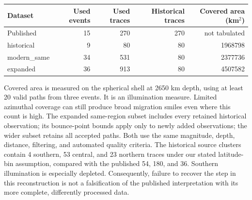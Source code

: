 \documentclass[10pt]{article}
\begin{document}
\begin{center}\begin{tabular}{lrrrr}\toprule
Dataset & Used events & Used traces & Historical traces & Covered area (km$^2$)\\\midrule
Published & 15 & 270 & 270 & not tabulated\\
historical & 9 & 80 & 80 & 1968798 \\
modern\_same & 34 & 531 & 80 & 2377736 \\
expanded & 36 & 913 & 80 & 4507582 \\
\bottomrule\end{tabular}\end{center}
Covered area is measured on the spherical shell at 2650 km depth, using at least
20 valid paths from three events. It is an illumination measure. Limited azimuthal
coverage can still produce broad migration smiles even where this count is high.
The expanded same-region subset includes every retained historical observation;
its bounce-point bounds apply only to newly added observations; the wider subset retains all accepted paths. Both use the
same magnitude, depth, distance, filtering, and automated quality criteria.
The historical source clusters contain 4 southern, 53 central, and 23 northern
traces under our stated latitude-bin assumption, compared with the published
54, 180, and 36. Southern illumination is especially depleted. Consequently,
failure to recover the step in this reconstruction is not a falsification of
the published interpretation with its more complete, differently processed data.
\end{document}
